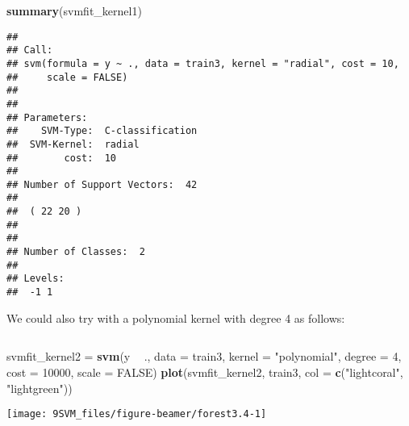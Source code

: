 \documentclass[10pt,ignorenonframetext,]{beamer}
\newenvironment{Shaded}{\begin{snugshade}}{\end{snugshade}}
\newcommand{\DataTypeTok}[1]{\textcolor[rgb]{0.13,0.29,0.53}{#1}}
\newcommand{\DecValTok}[1]{\textcolor[rgb]{0.00,0.00,0.81}{#1}}
\newcommand{\KeywordTok}[1]{\textcolor[rgb]{0.13,0.29,0.53}{\textbf{#1}}}
\newcommand{\NormalTok}[1]{#1}
\newcommand{\OperatorTok}[1]{\textcolor[rgb]{0.81,0.36,0.00}{\textbf{#1}}}
\newcommand{\OtherTok}[1]{\textcolor[rgb]{0.56,0.35,0.01}{#1}}
\newcommand{\StringTok}[1]{\textcolor[rgb]{0.31,0.60,0.02}{#1}}
\begin{document}
\begin{frame}[fragile]

\scriptsize

\begin{Shaded}
\begin{Highlighting}[]
\KeywordTok{summary}\NormalTok{(svmfit_kernel1)}
\end{Highlighting}
\end{Shaded}

\begin{verbatim}
## 
## Call:
## svm(formula = y ~ ., data = train3, kernel = "radial", cost = 10, 
##     scale = FALSE)
## 
## 
## Parameters:
##    SVM-Type:  C-classification 
##  SVM-Kernel:  radial 
##        cost:  10 
## 
## Number of Support Vectors:  42
## 
##  ( 22 20 )
## 
## 
## Number of Classes:  2 
## 
## Levels: 
##  -1 1
\end{verbatim}

\normalsize

\end{frame}

\begin{frame}[fragile]

We could also try with a polynomial kernel with degree 4 as follows:

\(~\)

\scriptsize

\begin{Shaded}
\begin{Highlighting}[]
\NormalTok{svmfit_kernel2 =}\StringTok{ }\KeywordTok{svm}\NormalTok{(y }\OperatorTok{~}\StringTok{ }\NormalTok{., }\DataTypeTok{data =}\NormalTok{ train3, }\DataTypeTok{kernel =} \StringTok{"polynomial"}\NormalTok{, }\DataTypeTok{degree =} \DecValTok{4}\NormalTok{, }
    \DataTypeTok{cost =} \DecValTok{10000}\NormalTok{, }\DataTypeTok{scale =} \OtherTok{FALSE}\NormalTok{)}
\KeywordTok{plot}\NormalTok{(svmfit_kernel2, train3, }\DataTypeTok{col =} \KeywordTok{c}\NormalTok{(}\StringTok{"lightcoral"}\NormalTok{, }\StringTok{"lightgreen"}\NormalTok{))}
\end{Highlighting}
\end{Shaded}

\begin{center}\texttt{[image: 9SVM\_files/figure-beamer/forest3.4-1]} \end{center}

\end{frame}
\end{document}
